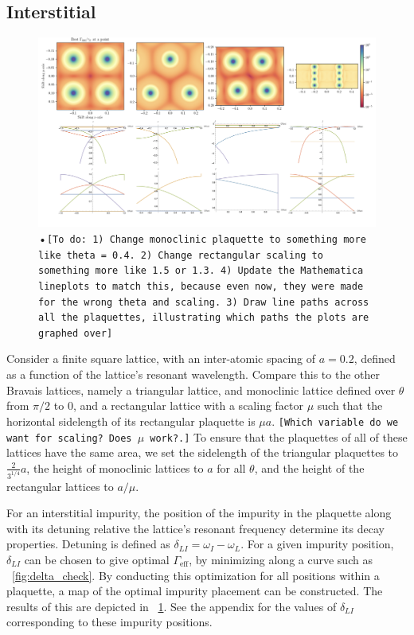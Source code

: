 \documentclass[aps,pra,superscriptaddress,twocolumn]{revtex4-1}
\newcommand{\fref}[1]{\text{Fig.}~\ref{#1}}
\newcommand{\commentSB}[1]{\texttt{\color{blue}[#1]}}
\begin{document}
\subsection{Interstitial}

\begin{figure}
    \centering
    \includegraphics[width=1.0\textwidth]{figures/interstitial_figure.png} 
    \caption{•\commentSB{To do: 1) Change monoclinic plaquette to something more like theta = 0.4.   2) Change rectangular scaling to something more like 1.5 or 1.3.  4) Update the Mathematica lineplots to match this, because even now, they were made for the wrong theta and scaling. 3) Draw line paths across all the plaquettes, illustrating which paths the plots are graphed over}}
    \label{fig:interstitial}
\end{figure}

Consider a finite square lattice, with an inter-atomic spacing of $a = 0.2$, defined as a function of the lattice's resonant wavelength. Compare this to the other Bravais lattices, namely a triangular lattice, and monoclinic lattice defined over $\theta$ from $\pi/2$ to $0$, and a rectangular lattice with a scaling factor $\mu$ such that the horizontal sidelength of its rectangular plaquette is $\mu a$. 
\commentSB{Which variable do we want for scaling? Does $\mu$ work?.} To ensure that the plaquettes of all of these lattices have the same area, we set the sidelength of the triangular plaquettes to $\frac{2}{3^{1/4}}a$, the height of monoclinic lattices to $a$ for all $\theta$, and the height of the rectangular lattices to $a/\mu$. 

For an interstitial impurity, the position of the impurity in the plaquette along with its detuning relative the lattice's resonant frequency determine its decay properties. Detuning is defined as $ \delta_{LI} = \omega_I - \omega_L$. For a given impurity position, $\delta_{LI}$ can be chosen to give optimal $\Gamma_\text{eff}$, by minimizing along a curve such as \fref{fig:delta_check}. By conducting this optimization for all positions within a plaquette, a map of the optimal impurity placement can be constructed. The results of this are depicted in \fref{fig:interstitial}. See the appendix for the values of $\delta_{LI}$ corresponding to these impurity positions. 
\end{document}
